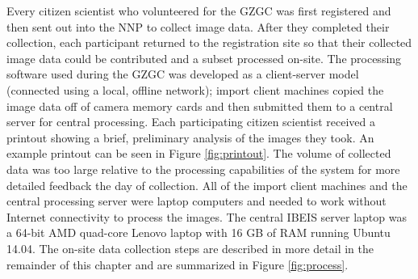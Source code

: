 
\begin{figure*}[t]%
	\centering
	\caption[Example Printout Returned to Each Citizen Scientist]{\textbf{Example printout returned to each citizen scientist}.  Each participating citizen scientist recieved a printout showing a map of where the car drove (in blue) and information for three animals seen by that photographer (black, red, and green).  The other sightings for the three animals were also marked on the map.  This is the printout that was given to citizen scientist ``A'' in car ``8 WHITE''.  This participant saw one new animal (red) and resighted two animals (black and green).  The pictures taken by the participant are shown on the left and the matching animal (or information on the new sighting) is shown on the right.  The recognition matches were provided by IBEIS using an initial database.  Best viewed in color.}
    	\label{fig:printout}
\end{figure*}

Every citizen scientist who volunteered for the GZGC was first registered and then sent out into the NNP to collect image data.  After they completed their collection, each participant returned to the registration site so that their collected image data could be contributed and a subset processed on-site.  The processing software used during the GZGC was developed as a client-server model (connected using a local, offline network); import client machines copied the image data off of camera memory cards and then submitted them to a central server for central processing.  Each participating citizen scientist received a printout showing a brief, preliminary analysis of the images they took.  An example printout can be seen in Figure \ref{fig:printout}.  The volume of collected data was too large relative to the processing capabilities of the system for more detailed feedback the day of collection.  All of the import client machines and the central processing server were laptop computers and needed to work without Internet connectivity to process the images.  The central IBEIS server laptop was a 64-bit AMD quad-core Lenovo laptop with 16 GB of RAM running Ubuntu 14.04.  The on-site data collection steps are described in more detail in the remainder of this chapter and are summarized in Figure \ref{fig:process}.

